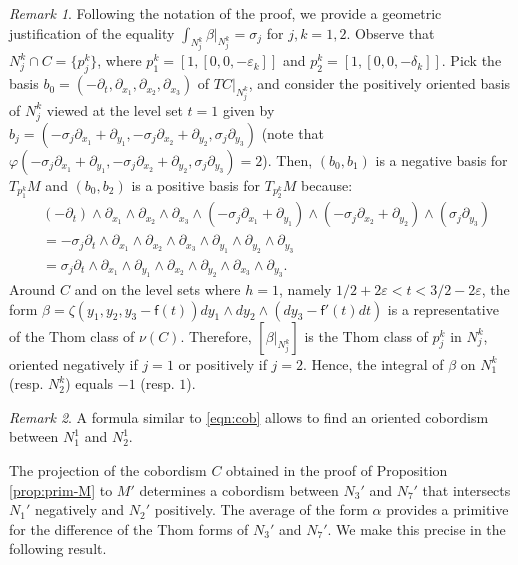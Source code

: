 \documentclass[10pt]{article}
\newcommand{\e}{\varepsilon}
\theoremstyle{plain}
\theoremstyle{definition}
\theoremstyle{remark}
\newtheorem{remark}{Remark}
\begin{document}
\begin{remark}
Following the notation of the proof, we provide a geometric justification of the equality $
\int_{N_j^k}{\beta|_{N_j^k}}=\sigma_j
$ for $j,k=1,2$.
 Observe that
 $N_j^k\cap C=\{p_j^k\}$, where $p_1^k=[1,[0,0,-\e_k]]$ and $p_2^k=[1,[0,0,-\delta_k ]]$. Pick 
 the basis $b_0=(-\partial_t, \partial_{x_1}, \partial_{x_2}, \partial_{x_3})$ of $TC|_{N_j^k}$, and consider the positively oriented  basis of $N_j^k$ viewed at the level set $t=1$
  given by $b_j=(-\sigma_j \partial_{x_1}+ \partial_{y_1}, -\sigma_j \partial_{x_2}+ \partial_{y_2}, \sigma_j \partial_{y_3})$ (note that $\varphi(-\sigma_j \partial_{x_1}+ \partial_{y_1}, -\sigma_j \partial_{x_2}+ \partial_{y_2}, \sigma_j \partial_{y_3})=2$). Then, 
$(b_0,b_1)$ is a negative basis for $T_{p_1^k}M$ and
$(b_0,b_2)$ is a positive basis for $T_{p_2^k}M$ because: 
\begin{align*}
&(-\partial_t) \wedge \partial_{x_1}\wedge \partial_{x_2} \wedge \partial_{x_3} \wedge (-\sigma_j \partial_{x_1}+ \partial_{y_1})\wedge ( -\sigma_j \partial_{x_2}+ \partial_{y_2})\wedge ( \sigma_j\partial_{y_3}) \\
&=
-\sigma_j \partial_t \wedge \partial_{x_1}\wedge \partial_{x_2} \wedge \partial_{x_3} \wedge \partial_{y_1}\wedge \partial_{y_2} \wedge \partial_{y_3}\\
&= \sigma_j \partial_t \wedge \partial_{x_1} \wedge \partial_{y_1} \wedge \partial_{x_2} \wedge \partial_{y_2} \wedge \partial_{x_3} \wedge \partial_{y_3}.
\end{align*}
Around $C$ and on the level sets where $h=1$, namely $1/2+2\e<t<3/2-2\e$, the form  $\beta=\zeta(y_1,y_2,y_3-\mathsf{f}(t)) dy_1\wedge dy_2 \wedge (dy_3-\mathsf{f}'(t)dt)$ is a representative of the Thom class of $\nu(C)$. Therefore,  
$[\beta|_{N_j^k}]$ is the Thom class of $p_j^k$ in $N_j^k$, oriented negatively if $j=1$ or positively if $j=2$. 
Hence, the integral of $\beta$ on $N_1^k$ (resp. $N_2^k$) equals $-1$ (resp. $1$).
\end{remark}

\begin{remark} A formula similar to \eqref{eqn:cob} allows to find
an oriented cobordism between $N_1^1$ and $N_2^1$.
\end{remark}



The projection of the cobordism $C$ obtained in the proof of Proposition \ref{prop:prim-M} to $M'$ determines a cobordism between $N_3'$ and $N_7'$ that intersects $N_1'$ negatively and $N_2'$ positively. The average of the form $\alpha$ provides a primitive for the difference of the Thom forms of $N_3'$ and $N_7'$. We make this precise in the following result.
\end{document}
